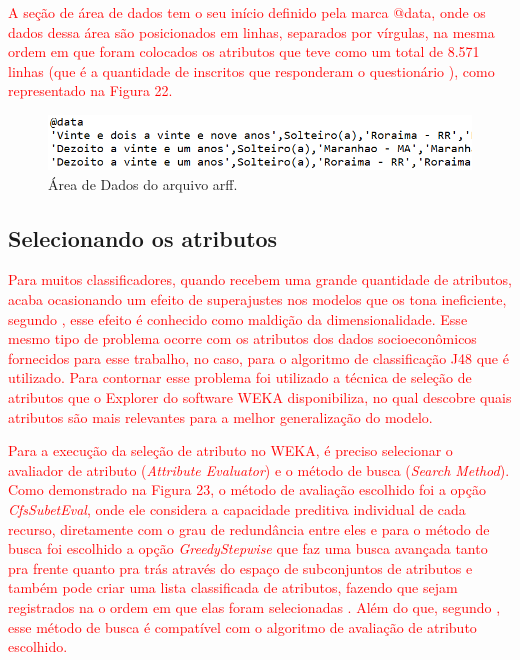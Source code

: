 \par
\textcolor{red}{A seção de área de dados tem o seu início definido pela marca @data, onde os dados dessa área são posicionados em linhas, separados por vírgulas, na mesma ordem em que foram colocados os atributos que teve como um total de 8.571 linhas (que é a quantidade de inscritos que responderam o questionário ), como representado na Figura 22.}

\par
\begin{figure}[!htp]
	\begin{center}
    \caption{\label{fig:waveform_fig} Área de Dados do arquivo arff.}
	\includegraphics[scale=0.60]{Figuras/arquivo_arff_2.png}
	\end{center}
\end{figure}


\subsection{Selecionando os atributos}

\par
\textcolor{red}{Para muitos classificadores, quando recebem uma grande quantidade de atributos, acaba ocasionando um efeito de superajustes nos modelos que os tona ineficiente, segundo , esse efeito é conhecido como maldição da dimensionalidade. Esse mesmo tipo de problema ocorre com os atributos dos dados socioeconômicos fornecidos para esse trabalho, no caso, para o algoritmo de classificação J48 que é utilizado. Para contornar esse problema foi utilizado a técnica de seleção de atributos que o Explorer do software WEKA disponibiliza, no qual descobre quais atributos são mais relevantes para a melhor generalização do modelo.}

\par
\textcolor{red}{Para a execução da seleção de atributo no WEKA, é preciso selecionar o avaliador de atributo (\textit{Attribute Evaluator}) e o método de busca (\textit{Search Method}). Como demonstrado na Figura 23, o método de avaliação escolhido foi a opção \textit{CfsSubetEval}, onde ele considera a capacidade preditiva individual de cada recurso, diretamente com o grau de redundância entre eles e para o método de busca foi escolhido a opção \textit{GreedyStepwise} que faz uma busca avançada tanto pra frente quanto pra trás através do espaço de subconjuntos de atributos e também pode criar uma lista classificada de atributos, fazendo que sejam registrados na o ordem em que elas foram selecionadas \cite{WEKA}. Além do que, segundo , esse método de busca é compatível com o algoritmo de avaliação de atributo escolhido. }

